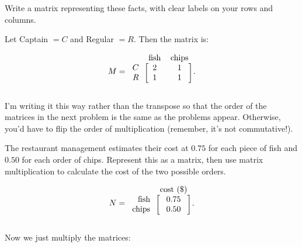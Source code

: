 \documentclass[../key.tex]{subfiles}
\begin{document}
\begin{inner_problem}[start=1]
\item Write a matrix representing these facts, with clear labels on your rows and columns.
\end{inner_problem}

Let Captain $=C$ and Regular $=R$. Then the matrix is:

$$M=\begin{blockarray}{rcc}
& \text{fish} & \text{chips} \\
\begin{block}{r[cc]}
C & 2 & 1 \\
R & 1 & 1 \\
\end{block}
\end{blockarray}.$$

I'm writing it this way rather than the transpose so that the order of the matrices in the next problem is the same as the problems appear. Otherwise, you'd have to flip the order of multiplication (remember, it's not commutative!).

\begin{inner_problem}
\item The restaurant management estimates their cost at $0.75$ for each piece of fish and $0.50$ for each order of chips. Represent this as a matrix, then use matrix multiplication to calculate the cost of the two possible orders.
\end{inner_problem}

$$N=\begin{blockarray}{rc}
& \text{cost (\$)} \\
\begin{block}{r[c]}
\text{fish} & 0.75 \\
\text{chips} & 0.50 \\
\end{block}
\end{blockarray}.$$

Now we just multiply the matrices:
\end{document}
